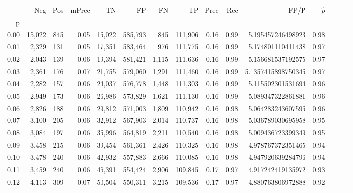 \begin{tabular}{rrrrrrrrrrrrrrr}
\toprule
{} &     Neg &    Pos & mPrec &       TN &       FP &       FN &       TP &  Prec &   Rec &                  FP/P & $\hat{p}$ \\
p    &         &        &       &          &          &          &          &       &       &                       &           \\
\midrule
0.00 &  15,022 &    845 &  0.05 &   15,022 &  585,793 &      845 &  111,906 &  0.16 &  0.99 &     5.195457246498923 &      0.98 \\
0.01 &   2,329 &    131 &  0.05 &   17,351 &  583,464 &      976 &  111,775 &  0.16 &  0.99 &     5.174801110411438 &      0.97 \\
0.02 &   2,043 &    139 &  0.06 &   19,394 &  581,421 &    1,115 &  111,636 &  0.16 &  0.99 &     5.156681537192575 &      0.97 \\
0.03 &   2,361 &    176 &  0.07 &   21,755 &  579,060 &    1,291 &  111,460 &  0.16 &  0.99 &    5.1357415898750345 &      0.97 \\
0.04 &   2,282 &    157 &  0.06 &   24,037 &  576,778 &    1,448 &  111,303 &  0.16 &  0.99 &     5.115502301531694 &      0.96 \\
0.05 &   2,949 &    173 &  0.06 &   26,986 &  573,829 &    1,621 &  111,130 &  0.16 &  0.99 &     5.089347322861881 &      0.96 \\
0.06 &   2,826 &    188 &  0.06 &   29,812 &  571,003 &    1,809 &  110,942 &  0.16 &  0.98 &     5.064283243607595 &      0.96 \\
0.07 &   3,100 &    205 &  0.06 &   32,912 &  567,903 &    2,014 &  110,737 &  0.16 &  0.98 &     5.036789030695958 &      0.95 \\
0.08 &   3,084 &    197 &  0.06 &   35,996 &  564,819 &    2,211 &  110,540 &  0.16 &  0.98 &     5.009436723399349 &      0.95 \\
0.09 &   3,458 &    215 &  0.06 &   39,454 &  561,361 &    2,426 &  110,325 &  0.16 &  0.98 &     4.978767372351465 &      0.94 \\
0.10 &   3,478 &    240 &  0.06 &   42,932 &  557,883 &    2,666 &  110,085 &  0.16 &  0.98 &     4.947920639284796 &      0.94 \\
0.11 &   3,459 &    240 &  0.06 &   46,391 &  554,424 &    2,906 &  109,845 &  0.17 &  0.97 &     4.917242419135972 &      0.93 \\
0.12 &   4,113 &    309 &  0.07 &   50,504 &  550,311 &    3,215 &  109,536 &  0.17 &  0.97 &     4.880763806972888 &      0.92 \\

\end{tabular}
